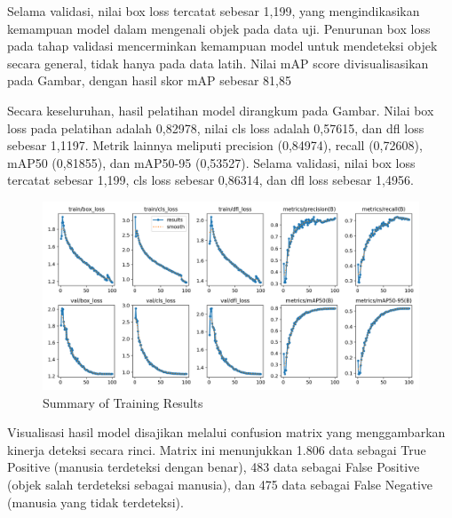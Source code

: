 Selama validasi, nilai box loss tercatat sebesar 1,199, yang mengindikasikan kemampuan model dalam mengenali objek pada data uji. Penurunan box loss pada tahap validasi mencerminkan kemampuan model untuk mendeteksi objek secara general, tidak hanya pada data latih. Nilai mAP score divisualisasikan pada Gambar, dengan hasil skor mAP sebesar 81,85%

Secara keseluruhan, hasil pelatihan model dirangkum pada Gambar. Nilai box loss pada pelatihan adalah 0,82978, nilai cls loss adalah 0,57615, dan dfl loss sebesar 1,1197. Metrik lainnya meliputi precision (0,84974), recall (0,72608), mAP50 (0,81855), dan mAP50-95 (0,53527). Selama validasi, nilai box loss tercatat sebesar 1,199, cls loss sebesar 0,86314, dan dfl loss sebesar 1,4956.

\begin{figure}[H]
    \centering
    \includegraphics[scale=0.4]{gambar/results.png}
    \caption{Summary of Training Results}
    \label{fig:Summary of Training Results}
\end{figure}

Visualisasi hasil model disajikan melalui confusion matrix yang menggambarkan kinerja deteksi secara rinci. Matrix ini menunjukkan 1.806 data sebagai True Positive (manusia terdeteksi dengan benar), 483 data sebagai False Positive (objek salah terdeteksi sebagai manusia), dan 475 data sebagai False Negative (manusia yang tidak terdeteksi).

